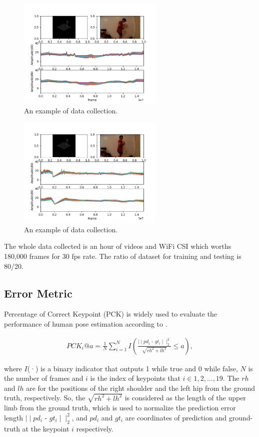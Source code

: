 \documentclass[10pt,letterpaper]{article}
\begin{document}
	
\begin{figure}[htbp]
	\centerline{\includegraphics[width=70mm,scale=0.2]{VIS02.png}}
	\caption{An example of data collection.}
	\label{fig:VIS02}
\end{figure}
\begin{figure}[htbp]
	\centerline{\includegraphics[width=70mm,scale=0.2]{VIS03.png}}
	\caption{An example of data collection.}
	\label{fig:VIS03}
\end{figure}


	The whole data collected is an hour of videos and WiFi CSI which worths 180,000 frames for 30 fps rate. The ratio of dataset for training and testing is 80/20.
	
	
	\subsection*{Error Metric}
	
	
	Percentage of Correct Keypoint (PCK) is widely used to evaluate the performance of human pose estimation according to \cite{wangF }.
	
	\begin{equation}
	\begin{aligned}
	PCK_i@a = \frac{1}{N} \sum_{i=1}^{N}
	I(
	\frac{\mid \mid  pd_i \text{ - } gt_i \mid \mid^2_2}{\sqrt{rh^2+lh^2}}  \le a ),
	\label{eq:PCK}
	\end{aligned}
	\end{equation}
	
	
	where $I$(·) is a binary indicator that outputs 1 while true and 0 while false, 
	$N$ is the number of frames and $i$ is the index of keypoints that $i \in {1, 2, ..., 19}$. The $rh$ and
	$lh$ are for the positions of the right shoulder and the left hip from the ground truth, respectively.
	So, the ${\sqrt{rh^2+lh^2}}$ is  considered as the length of the upper limb from the ground truth, which is used to normalize the prediction error length
	$ \mid \mid pd_i \text{ - } gt_i \mid \mid _2^2$, and $pd_i$ and $gt_i$ are coordinates of prediction and ground-truth at the keypoint $i$ respectively.
	
\end{document}
